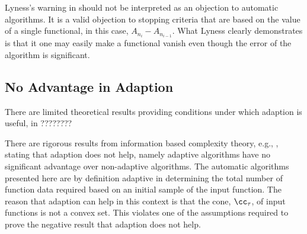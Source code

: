 \documentclass[]{elsarticle}
\theoremstyle{definition}
\theoremstyle{remark}
\begin{document}
Lyness's warning in \cite{Lyn83} should not be interpreted as an objection to automatic algorithms.  It is a valid objection to stopping criteria that are based on the value of a single functional, in this case, $A_{n_{i}}-A_{n_{i-1}}$.  What Lyness clearly demonstrates is that it one may easily make a functional vanish even though the error of the algorithm is significant.

\subsection{No Advantage in Adaption}

There are limited theoretical results providing conditions under which adaption is useful, in ????????


There are rigorous results from information based complexity theory, e.g., \citep[Chapter 4, Theorem 5.2.1]{TraWasWoz88}, stating that adaption does not help, namely adaptive algorithms have no significant advantage over non-adaptive algorithms. The automatic algorithms presented here are by definition adaptive in determining the total number of function data required based on an initial sample of the input function.  The reason that adaption can help in this context is that the cone, $\cc_{\tau}$, of input functions is not a convex set.  This violates one of the assumptions required to prove the negative result that adaption does not help.
\end{document}

